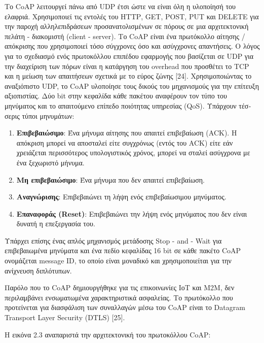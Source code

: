 	Το  CoAP λειτουργεί πάνω από UDP έτσι ώστε να είναι όλη η υλοποίησή του ελαφριά. Χρησιμοποιεί τις εντολές του ΗΤΤΡ, GET, POST, PUT και DELETE για την παροχή αλληλεπιδράσεων προσανατολισμένων σε πόρους σε μια αρχιτεκτονική πελάτη - διακομιστή (client - server). Το CoAP είναι ένα πρωτόκολλο  αίτησης / απόκρισης που χρησιμοποιεί τόσο σύγχρονες όσο και ασύγχρονες απαντήσεις. Ο λόγος για το σχεδιασμό ενός πρωτοκόλλου επι­πέδου εφαρμογής που βασίζεται σε UDP για την διαχείριση των πόρων είναι η κατάργηση του overhead που προσθέτει το TCP και η μείωση των απαιτήσεων σχετικά με το εύρος ζώνης [24]. Χρησι­μοποιώντας το αναξιόπιστο UDP, το CoAP υλοποίησε τους δικούς του μηχανισμούς για την επίτευξη αξιοπιστίας. Δύο bit στην κε­φαλίδα κάθε πακέτου αναφέρουν τον τύπο του μηνύματος και το απαιτούμενο επίπεδο ποιότητας υπηρεσίας (QoS).  Υπάρχουν τέσ­σερις τύποι μηνυμάτων: 
	
\begin{enumerate}
	\item{\textbf{Επιβεβαιώσιμο}: Ένα μήνυμα αίτησης που απαιτεί επιβεβαίωση (ACK). Η απόκριση μπορεί να αποσταλεί είτε συγχρόνως (εντός του ACK) είτε εάν χρειάζεται περισσότερος υπολογιστικός χρόνος, μπορεί να σταλεί ασύγχρονα με ένα ξεχωριστό μήνυμα.}
	\item{\textbf{Μη επιβεβαιώσιμο}: Ένα μήνυμα που δεν απαιτεί επιβεβαίωση.}
	\item{\textbf{Αναγνώρισης}: Επιβεβαιώνει τη λήψη ενός επιβεβαίωσιμου μηνύματος.}
	\item{\textbf{Επαναφοράς (Reset)}: Επιβεβαιώνει την λήψη ενός μηνύματος που δεν είναι δυνατή η επεξεργασία του.}
\end{enumerate}

Υπάρχει επίσης ένας απλός μηχανισμός μετάδοσης Stop - and - Wait για επιβεβαιωμένα μηνύματα και ένα πεδίο κεφαλίδας 16 bit σε κάθε πακέτο CoAP ονομάζεται message ID, το οποίο εί­ναι μοναδικό και χρησιμοποιείται για την ανίχνευση διπλότυπων.  

	Παρόλο που το CoAP δημιουργήθηκε για τις επικοινωνίες ΙοΤ και Μ2Μ, δεν περιλαμβάνει ενσωματωμένα χαρακτηριστικά ασφαλείας. Το πρωτόκολλο που προτείνεται για διασφάλιση των συναλλαγών μέσω του CoAP είναι το Datagram Transport Layer Security (DTLS) [25].

	Η εικόνα 2.3 αναπαριστά την αρχιτεκτονική του πρωτοκόλλου CoAP: 
	
